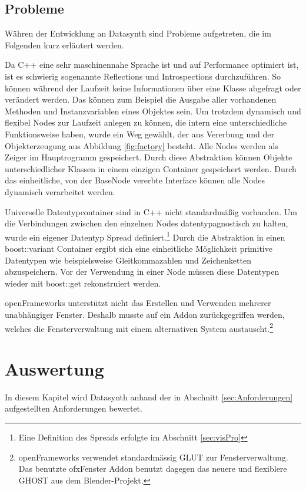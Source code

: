 \documentclass[a4paper, 12pt, DIV=calc, version=first, pdftex, headsepline, footsepline, bibtotocnumbered, liststotocnumbered]{scrreprt}
\begin{document}
\section{Probleme}
\label{sec:Probleme}
Währen der Entwicklung an Datasynth sind Probleme aufgetreten, die im Folgenden
kurz erläutert werden.

Da C++ eine sehr maschinennahe Sprache ist und auf Performance optimiert ist,
ist es schwierig sogenannte Reflections und Introspections durchzuführen.
So können während der Laufzeit keine Informationen
über eine Klasse abgefragt oder verändert werden. Das können zum Beispiel
die Ausgabe aller vorhandenen Methoden und Instanzvariablen eines Objektes sein.
Um trotzdem dynamisch und flexibel Nodes zur Laufzeit anlegen zu können, die
intern eine unterschiedliche Funktionsweise haben, wurde
ein Weg gewählt, der aus Vererbung und der Objekterzeugung aus Abbildung
\ref{fig:factory} besteht. Alle Nodes werden als Zeiger
im Hauptrogramm gespeichert. Durch diese Abstraktion können Objekte
unterschiedlicher Klassen in einem einzigen Container gespeichert werden.
Durch das einheitliche, von der BaseNode vererbte Interface können alle
Nodes dynamisch verarbeitet werden.

Universelle Datentypcontainer sind in C++ nicht standardmäßig vorhanden. Um die Verbindungen
zwischen den einzelnen Nodes datentypagnostisch zu halten, wurde ein
eigener Datentyp Spread definiert.\footnote{Eine Definition des Spreads erfolgte im Abschnitt \ref{sec:visPro}}
Durch die Abstraktion in einen boost::variant Container ergibt sich eine einheitliche Möglichkeit primitive Datentypen
wie beispielsweise Gleitkommazahlen und Zeichenketten abzuspeichern. Vor der Verwendung in einer Node müssen diese
Datentypen wieder mit boost::get rekonstruiert werden.

openFrameworks unterstützt nicht das Erstellen und Verwenden mehrerer
unabhängiger Fenster. Deshalb musste
auf ein Addon zurückgegriffen werden, welches die Fensterverwaltung
mit einem alternativen System austauscht.\footnote{openFrameworks verwendet standardmässig GLUT
zur Fensterverwaltung. Das benutzte ofxFenster Addon benutzt dagegen das neuere und
flexiblere GHOST aus dem Blender-Projekt.}

\chapter{Auswertung}
\label{cha:Auswertung}
In diesem Kapitel wird Datasynth anhand der in Abschnitt \ref{sec:Anforderungen}
aufgestellten Anforderungen bewertet.
\end{document}
